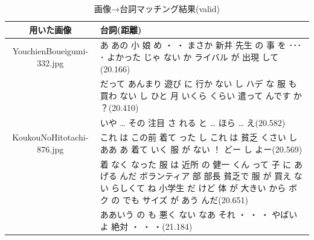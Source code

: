 \documentclass[onecolumn]{ujarticle}   %
\begin{document}
	\begin{table}[h]
		\vspace{-3mm}
		\centering
		\caption{画像→台詞マッチング結果(valid)}
		\label{tab:result}
		\begin{tabular}{|c|p{11cm}|} \hline
			用いた画像&台詞(距離)\\ \hline\hline
			\multirow{1}{*}{YouchienBoueigumi-332.jpg}&あ あの 小 娘 め ・ ・ まさか 新井 先生 の 事 を ･･･ ･ よかった じゃ ない か ライバル が 出現 して(20.166) \\ \cline{2-2}
			&だって あんまり 遊び に 行か ない し ハデ な 服 も 買わ ない し ひと 月 いくら くらい 遣って んです か ？(20.410) \\ \cline{2-2}
			&いや … その 注目 さ れる と … ほら … え(20.582)\\ \hline
			\multirow{1}{*}{KoukouNoHitotachi-876.jpg}&これ は この前 着て った し これ は 貧乏 くさい し ああ あ 着て いく 服 が ない ！ どー し よー(20.569) \\ \cline{2-2}
			&着 なく なった 服 は 近所 の 健一 くん って 子 に あげる んだ ボランティア 部 部長 貧乏で 服 が 買え ない らしくて ね 小学生 だ けど 体 が 大きい から ボク の でも サイズ が あう んだ(20.651) \\ \cline{2-2}
			&ああいう の も 悪く ない なあ それ ・ ・ ・ やばい よ 絶対 ・ ・ ・(21.184) \\ \hline
		\end{tabular}
	\end{table}
\end{document}
